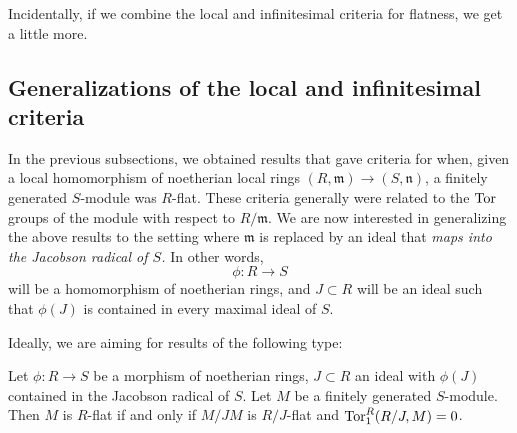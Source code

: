 Incidentally, if we combine the local and infinitesimal criteria for flatness, we get a little more.

\begin{comment}
\subsection{The $\gr$ criterion for flatness}

Suppose $(R, \mathfrak{m})$ is a noetherian local ring and $(S, \mathfrak{n})$
a local $R$-algebra.
As usual, we are interested in criteria for when a finitely generated
$S$-module $M$ is flat over $R$.

We can, of course, endow $M$ with the $\mathfrak{m}$-adic topology. 
Then $M$ is a filtered module over the filtered ring $R$ (with the
$\mathfrak{m}$-adic topology).
We have morphisms for each $i$,
\[ \mathfrak{m}^i/\mathfrak{m}^{i +1} \otimes_{R/\mathfrak{m}}
M/\mathfrak{m}M \to \mathfrak{m}^i M/\mathfrak{m}^{i+1} M  \]
that induce map
\[ \gr(R) \otimes_{R/\mathfrak{m}}  M/\mathfrak{m}M \to \gr(M). \]

If $M$ is flat over 
\end{comment}

\subsection{Generalizations of the local and infinitesimal criteria}
In the previous subsections, we obtained results that gave criteria for when,
given a local homomorphism of noetherian local rings $(R, \mathfrak{m}) \to
(S, \mathfrak{n})$, a finitely generated $S$-module was $R$-flat. 
These criteria generally were related to the $\operatorname{Tor}$ groups of the module with
respect to $R/\mathfrak{m}$.
We are now interested in generalizing the above results to the setting where
$\mathfrak{m}$ is replaced by an ideal that \emph{maps into the Jacobson radical of $S$.}
In other words, 
\[ \phi: R \to S  \]
will be a homomorphism of noetherian rings, and $J \subset R$ will be an ideal
such that $\phi(J)$ is contained in every maximal ideal of $S$. 

Ideally, we are aiming for results of the following type:
\begin{theorem} \label{localcritg}
Let $\phi: R \to S$ be a morphism of noetherian rings, $J \subset R$ an ideal
with $\phi(J) $ contained in the Jacobson radical of $S$.
Let $M$ be a finitely generated $S$-module. Then $M$ is $R$-flat if and only if
$M /JM$ is $R/J$-flat and $\operatorname{Tor}_1^R(R/J, M) = 0$.
\end{theorem} 

